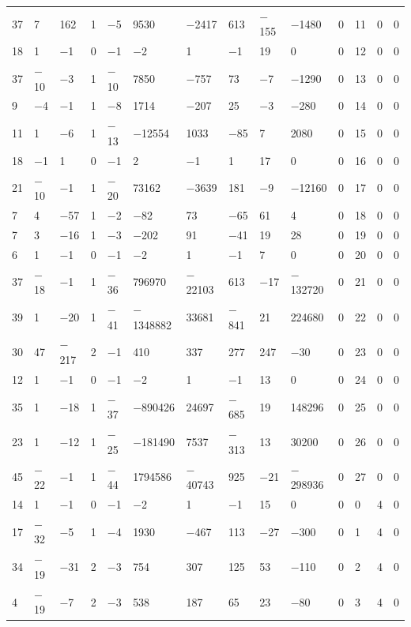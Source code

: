\documentclass[10pt,a4paper]{amsart}
\numberwithin{equation}{section}
\theoremstyle{definition}
\numberwithin{table}{section}
\begin{document}
{\begin{paracol}{3}
\begin{supertabular}{|w{c}{.32cm}w{c}{.32cm}w{c}{.32cm}@{\hspace{.5cm}}w{c}{.2cm}w{c}{.2cm}|@{\hspace{\tabcolsep}}HHHHHHw{c}{.17cm}w{c}{.17cm}w{c}{.17cm}|}
			37 & 7 & 162 & 1 & $-$5 & 9530 & $-$2417 & 613 & $-$155 & $-$1480 & 0 & 11 & 0 & 0 \\
			18 & 1 & $-$1 & 0 & $-$1 & $-$2 & 1 & $-$1 & 19 & 0 & 0 & 12 & 0 & 0 \\
			37 & $-$10 & $-$3 & 1 & $-$10 & 7850 & $-$757 & 73 & $-$7 & $-$1290 & 0 & 13 & 0 & 0 \\
			9 & $-$4 & $-$1 & 1 & $-$8 & 1714 & $-$207 & 25 & $-$3 & $-$280 & 0 & 14 & 0 & 0 \\
			11 & 1 & $-$6 & 1 & $-$13 & $-$12554 & 1033 & $-$85 & 7 & 2080 & 0 & 15 & 0 & 0 \\
			18 & $-$1 & 1 & 0 & $-$1 & 2 & $-$1 & 1 & 17 & 0 & 0 & 16 & 0 & 0 \\
			21 & $-$10 & $-$1 & 1 & $-$20 & 73162 & $-$3639 & 181 & $-$9 & $-$12160 & 0 & 17 & 0 & 0 \\
			7 & 4 & $-$57 & 1 & $-$2 & $-$82 & 73 & $-$65 & 61 & 4 & 0 & 18 & 0 & 0 \\
			7 & 3 & $-$16 & 1 & $-$3 & $-$202 & 91 & $-$41 & 19 & 28 & 0 & 19 & 0 & 0 \\
			6 & 1 & $-$1 & 0 & $-$1 & $-$2 & 1 & $-$1 & 7 & 0 & 0 & 20 & 0 & 0 \\
			37 & $-$18 & $-$1 & 1 & $-$36 & 796970 & $-$22103 & 613 & $-$17 & $-$132720 & 0 & 21 & 0 & 0 \\
			39 & 1 & $-$20 & 1 & $-$41 & $-$1348882 & 33681 & $-$841 & 21 & 224680 & 0 & 22 & 0 & 0 \\
			30 & 47 & $-$217 & 2 & $-$1 & 410 & 337 & 277 & 247 & $-$30 & 0 & 23 & 0 & 0 \\
			12 & 1 & $-$1 & 0 & $-$1 & $-$2 & 1 & $-$1 & 13 & 0 & 0 & 24 & 0 & 0 \\
			35 & 1 & $-$18 & 1 & $-$37 & $-$890426 & 24697 & $-$685 & 19 & 148296 & 0 & 25 & 0 & 0 \\
			23 & 1 & $-$12 & 1 & $-$25 & $-$181490 & 7537 & $-$313 & 13 & 30200 & 0 & 26 & 0 & 0 \\
			45 & $-$22 & $-$1 & 1 & $-$44 & 1794586 & $-$40743 & 925 & $-$21 & $-$298936 & 0 & 27 & 0 & 0 \\
			14 & 1 & $-$1 & 0 & $-$1 & $-$2 & 1 & $-$1 & 15 & 0 & 0 & 0 & 4 & 0 \\
			17 & $-$32 & $-$5 & 1 & $-$4 & 1930 & $-$467 & 113 & $-$27 & $-$300 & 0 & 1 & 4 & 0 \\
			34 & $-$19 & $-$31 & 2 & $-$3 & 754 & 307 & 125 & 53 & $-$110 & 0 & 2 & 4 & 0 \\
			4 & $-$19 & $-$7 & 2 & $-$3 & 538 & 187 & 65 & 23 & $-$80 & 0 & 3 & 4 & 0 \\

\end{supertabular}
\end{paracol}}
\end{document}
